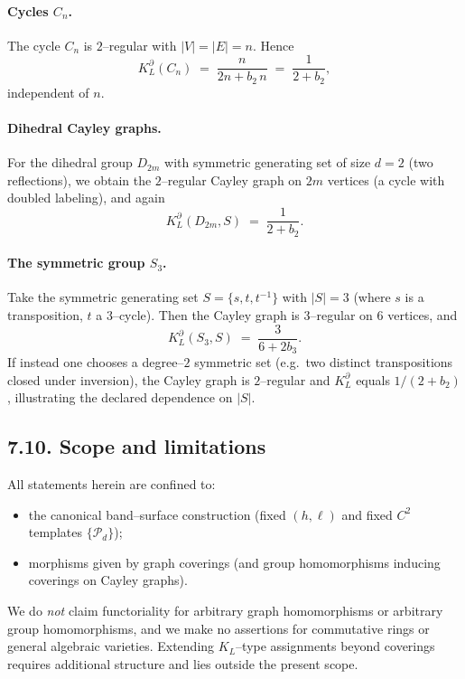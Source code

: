 \paragraph{Cycles $C_n$.}
The cycle $C_n$ is $2$–regular with $|V|=|E|=n$. Hence
\[
K_L^\partial(C_n) \;=\; \frac{n}{2n + b_2\, n} \;=\; \frac{1}{2+b_2},
\]
independent of $n$.

\paragraph{Dihedral Cayley graphs.}
For the dihedral group $D_{2m}$ with symmetric generating set of size $d=2$ (two reflections), we obtain the $2$–regular Cayley graph on $2m$ vertices (a cycle with doubled labeling), and again
\[
K_L^\partial(D_{2m},S) \;=\; \frac{1}{2+b_2}.
\]

\paragraph{The symmetric group $S_3$.}
Take the symmetric generating set $S=\{s,t,t^{-1}\}$ with $|S|=3$ (where $s$ is a transposition, $t$ a $3$–cycle). Then the Cayley graph is $3$–regular on $6$ vertices, and
\[
K_L^\partial(S_3,S) \;=\; \frac{3}{6+2b_3}.
\]
If instead one chooses a degree–$2$ symmetric set (e.g.\ two distinct transpositions closed under inversion), the Cayley graph is $2$–regular and $K_L^\partial$ equals $1/(2+b_2)$, illustrating the declared dependence on $|S|$.

\subsection*{7.10. Scope and limitations}
All statements herein are confined to:
\begin{itemize}
\item the canonical band–surface construction (fixed $(h,\ell)$ and fixed $C^2$ templates $\{\mathcal{P}_d\}$);
\item morphisms given by graph coverings (and group homomorphisms inducing coverings on Cayley graphs).
\end{itemize}
We do \emph{not} claim functoriality for arbitrary graph homomorphisms or arbitrary group homomorphisms, and we make no assertions for commutative rings or general algebraic varieties. Extending $K_L$–type assignments beyond coverings requires additional structure and lies outside the present scope.

